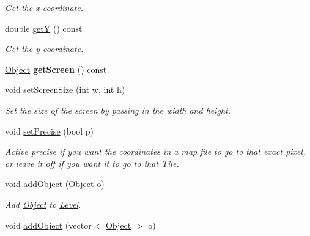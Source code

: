 \begin{DoxyCompactItemize}
\begin{DoxyCompactList}\small\item\em Get the x coordinate. \end{DoxyCompactList}\item 
double \hyperlink{classLevel_acb5b4e5e0bf364142fa0facc7badea4a}{getY} () const \hypertarget{classLevel_acb5b4e5e0bf364142fa0facc7badea4a}{}\label{classLevel_acb5b4e5e0bf364142fa0facc7badea4a}

\begin{DoxyCompactList}\small\item\em Get the y coordinate. \end{DoxyCompactList}\item 
\hyperlink{classObject}{Object} {\bfseries get\+Screen} () const \hypertarget{classLevel_afb6205bfc9804c5ec5561696341b6dc7}{}\label{classLevel_afb6205bfc9804c5ec5561696341b6dc7}

\item 
void \hyperlink{classLevel_a22a202624bb540acc74b678b74b60c9d}{set\+Screen\+Size} (int w, int h)\hypertarget{classLevel_a22a202624bb540acc74b678b74b60c9d}{}\label{classLevel_a22a202624bb540acc74b678b74b60c9d}

\begin{DoxyCompactList}\small\item\em Set the size of the screen by passing in the width and height. \end{DoxyCompactList}\item 
void \hyperlink{classLevel_a6f522671fde4a9d25945a9df651f6e28}{set\+Precise} (bool p)\hypertarget{classLevel_a6f522671fde4a9d25945a9df651f6e28}{}\label{classLevel_a6f522671fde4a9d25945a9df651f6e28}

\begin{DoxyCompactList}\small\item\em Active precise if you want the coordinates in a map file to go to that exact pixel, or leave it off if you want it to go to that \hyperlink{classTile}{Tile}. \end{DoxyCompactList}\item 
void \hyperlink{classLevel_a85e4149562c645b6ee11e7a0338dc6d6}{add\+Object} (\hyperlink{classObject}{Object} o)\hypertarget{classLevel_a85e4149562c645b6ee11e7a0338dc6d6}{}\label{classLevel_a85e4149562c645b6ee11e7a0338dc6d6}

\begin{DoxyCompactList}\small\item\em Add \hyperlink{classObject}{Object} to \hyperlink{classLevel}{Level}. \end{DoxyCompactList}\item 
void \hyperlink{classLevel_a227e7b01aecb4cfd14cd54233788dee2}{add\+Object} (vector$<$ \hyperlink{classObject}{Object} $>$ o)\hypertarget{classLevel_a227e7b01aecb4cfd14cd54233788dee2}{}\label{classLevel_a227e7b01aecb4cfd14cd54233788dee2}


\end{DoxyCompactItemize}
